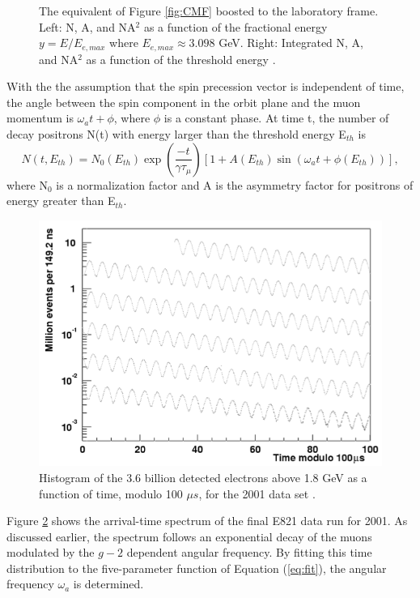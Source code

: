 \documentclass{outhesis}
\begin{document}
\begin{figure}
\begin{subfigure}
  \end{subfigure}
\caption[Decay electrons and asymmetry distributions in the laboratory frame.]{The equivalent of Figure \ref{fig:CMF} boosted to the laboratory frame. Left: N, A, and NA$^2$ as a function of the fractional energy $y=E/E_{e,max}$ where $E_{e,max} \approx 3.098$ GeV. Right: Integrated N, A, and NA$^2$ as a function of the threshold energy \cite{bnl}.}
\label{fig:LAB}
\end{figure}

With the the assumption that the spin precession vector is independent of time, the angle between the spin component in the orbit plane and the muon momentum is $\omega_at+\phi$, where $\phi$ is a constant phase. At time t, the number of decay positrons N(t) with energy larger than the threshold energy E$_{th}$ is
\begin{equation}
N(t, E_{th}) = N_0(E_{th})\exp \left(\frac{-t}{\gamma \tau_{\mu}}\right) \left[1 + A(E_{th})  \sin\left(\omega_a t + \phi(E_{th})\right)\right],
\label{eq:fit}
\end{equation}
where N$_0$ is a normalization factor and A is the asymmetry factor for positrons of energy greater than E$_{th}$. 
\begin{figure}
  \centering
  \includegraphics[scale=0.5]{figures/oscillation}
  \caption[Histogram of detected electrons]{Histogram of the 3.6 billion detected electrons above 1.8 GeV as a function of time, modulo 100 $\mu s$, for the 2001 data set \cite{bnl}.}
  \label{fig:osc}
\end{figure}
Figure \ref{fig:osc} shows the arrival-time spectrum of the final E821 data run for 2001. As discussed earlier, the spectrum follows an exponential decay of the muons modulated by the $g-2$ dependent angular frequency. By fitting this time distribution to the five-parameter function of Equation (\ref{eq:fit}), the angular frequency $\omega_a$ is determined.
\end{document}
